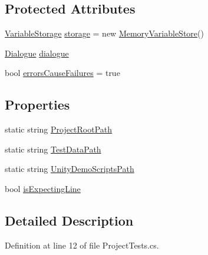 \subsection*{Protected Attributes}
\begin{DoxyCompactItemize}
\item 
\hyperlink{a00167}{Variable\-Storage} \hyperlink{a00152_a23d59ace1516ca72924c6fe3feafd3f7}{storage} = new \hyperlink{a00128}{Memory\-Variable\-Store}()
\item 
\hyperlink{a00088}{Dialogue} \hyperlink{a00152_a4cff5de56c4b8a91c76b6eb2d622a795}{dialogue}
\item 
bool \hyperlink{a00152_ac978fe85db843c51411f5517bdbe0eb8}{errors\-Cause\-Failures} = true
\end{DoxyCompactItemize}
\subsection*{Properties}
\begin{DoxyCompactItemize}
\item 
static string \hyperlink{a00152_ab1ad614f465a49447da31c4000ec6b3e}{Project\-Root\-Path}
\item 
static string \hyperlink{a00152_aa9b4d902d61adad7165154a265f69aa4}{Test\-Data\-Path}
\item 
static string \hyperlink{a00152_a39922286f6255e4fd0e433a4fc7521c4}{Unity\-Demo\-Scripts\-Path}
\item 
bool \hyperlink{a00152_a47f35b8e8123ed9471883d02b8bc9f3e}{is\-Expecting\-Line}
\end{DoxyCompactItemize}


\subsection{Detailed Description}


Definition at line 12 of file Project\-Tests.\-cs.



